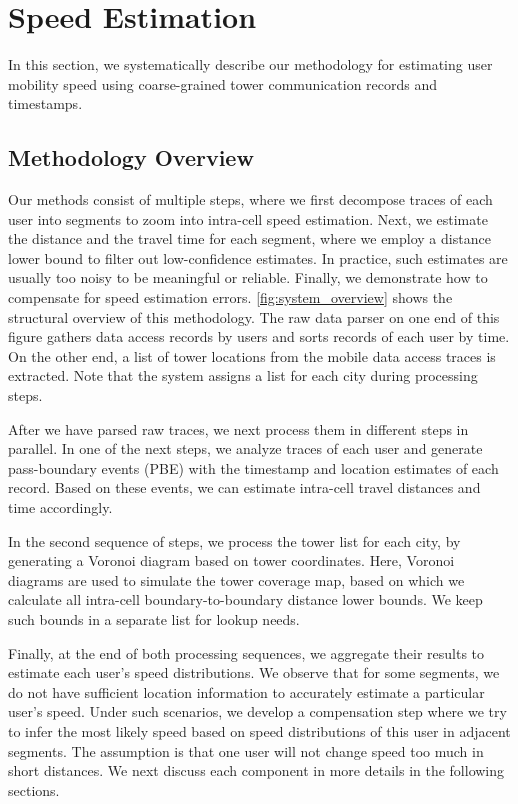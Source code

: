 \section{Speed Estimation}\label{approach}

In this section, we systematically describe our methodology for estimating user mobility speed using coarse-grained tower communication records and timestamps.

\subsection{Methodology Overview}

Our methods consist of multiple steps, where we first decompose traces of each user into segments to zoom into intra-cell speed estimation. Next, we estimate the distance and the travel time for each segment, where we employ a distance lower bound to filter out low-confidence estimates. In practice, such estimates are usually too noisy to be meaningful or reliable. Finally, we demonstrate how to compensate for speed estimation errors. \autoref{fig:system_overview} shows the structural overview of this methodology. The raw data parser on one end of this figure gathers data access records by users and sorts records of each user by time. On the other end, a list of tower locations from the mobile data access traces is extracted. Note that the system assigns a list for each city during processing steps.

After we have parsed raw traces, we next process them in different steps in parallel. In one of the next steps, we analyze traces of each user and generate pass-boundary events (PBE) with the timestamp and location estimates of each record. Based on these events, we can estimate intra-cell travel distances and time accordingly.

In the second sequence of steps, we process the tower list for each city, by generating a Voronoi diagram based on tower coordinates. Here, Voronoi diagrams are used to simulate the tower coverage map, based on which we calculate all intra-cell boundary-to-boundary distance lower bounds. We keep such bounds in a separate list for lookup needs.

Finally, at the end of both processing sequences, we aggregate their results to estimate each user's speed distributions. We observe that for some segments, we do not have sufficient location information to accurately estimate a particular user's speed. Under such scenarios, we develop a compensation step where we try to infer the most likely speed based on speed distributions of this user in adjacent segments. The assumption is that one user will not change speed too much in short distances. We next discuss each component in more details in the following sections.

